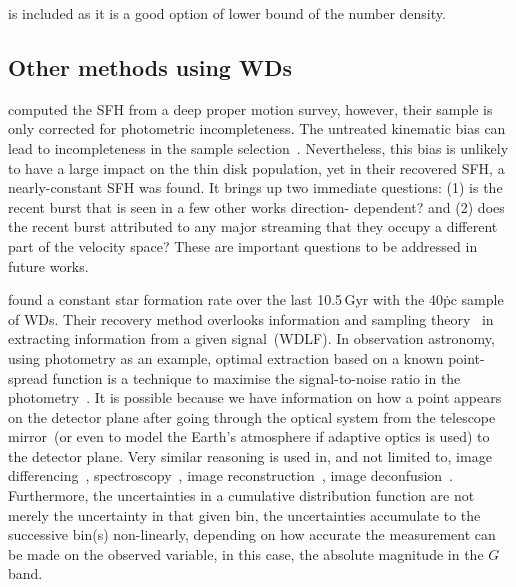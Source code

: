 \documentclass[fleqn,usenatbib]{mnras}
\begin{document}
\citet{2019ApJ...878L..11I} is included as it is a good option of lower bound
of the number density.

\subsection{Other methods using WDs}
\citet{2014ApJ...791...92T}


\citet{2019ApJ...887..148F} computed the SFH from a deep proper motion survey,
however, their sample is only corrected for photometric incompleteness. The
untreated kinematic bias can lead to incompleteness in the sample
selection~\citep{2014ApJ...791...92T, 2015MNRAS.450.4098L}. Nevertheless, this
bias is unlikely to have a large impact on the thin disk population, yet in
their recovered SFH, a nearly-constant SFH was found. It brings up two immediate
questions: (1) is the recent burst that is seen in a few other works direction-
dependent? and (2) does the recent burst attributed to any major streaming that
they occupy a different part of the velocity space? These are important
questions to be addressed in future works.

\citet{2023MNRAS.522.1643C} found a constant star formation rate over the last
10.5\,Gyr with the 40\.pc sample of WDs. Their recovery method overlooks
information and sampling theory~\citep{1949IEEEP..37...10S} in extracting
information from a given signal~(WDLF). In observation astronomy, using
photometry as an example, optimal extraction based on a known point-spread
function is a technique to maximise the signal-to-noise ratio in the 
photometry~\citep{1980SPIE..264..171T, 1987PASP...99..191S}.
It is possible because we have information on how a point appears on the
detector plane after going through the optical system from the telescope
mirror~(or even to model the Earth's atmosphere if adaptive optics is used) to
the detector plane. Very similar reasoning is used in, and not limited to,
image differencing~\citep{1998ApJ...503..325A, 2008MNRAS.386L..77B,
2009MNRAS.397.2099A, 2016ApJ...830...27Z},
spectroscopy~\citep{1986PASP...98..609H, 1989PASP..101.1032M,
2003PASP..115..688K}, image reconstruction~\citep{1972JOSA...62...55R,
1974AJ.....79..745L}, image deconfusion~\citep{2015A&A...582A..15M}.
Furthermore, the uncertainties in a cumulative distribution function are not
merely the uncertainty in that given bin, the uncertainties accumulate to the
successive bin(s) non-linearly, depending on how accurate the measurement can
be made on the observed variable, in this case, the absolute magnitude in the
$G$ band.
\end{document}

